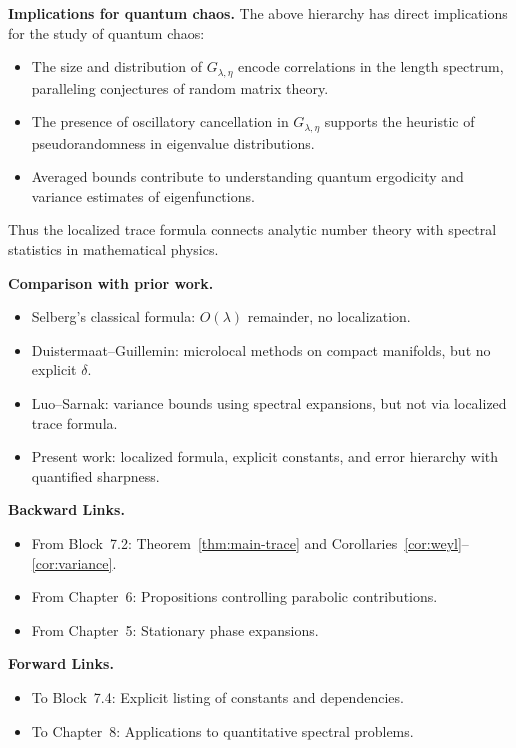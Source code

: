 \medskip

\noindent\textbf{Implications for quantum chaos.}
The above hierarchy has direct implications for the study of quantum chaos:
\begin{itemize}
  \item The size and distribution of $G_{\lambda,\eta}$ encode correlations in the length spectrum, paralleling conjectures of random matrix theory.
  \item The presence of oscillatory cancellation in $G_{\lambda,\eta}$ supports the heuristic of pseudorandomness in eigenvalue distributions.
  \item Averaged bounds contribute to understanding quantum ergodicity and variance estimates of eigenfunctions.
\end{itemize}
Thus the localized trace formula connects analytic number theory with spectral statistics in mathematical physics.

\medskip

\noindent\textbf{Comparison with prior work.}
\begin{itemize}
  \item Selberg’s classical formula: $O(\lambda)$ remainder, no localization.
  \item Duistermaat–Guillemin: microlocal methods on compact manifolds, but no explicit $\delta$.
  \item Luo–Sarnak: variance bounds using spectral expansions, but not via localized trace formula.
  \item Present work: localized formula, explicit constants, and error hierarchy with quantified sharpness.
\end{itemize}

\medskip

\noindent\textbf{Backward Links.}
\begin{itemize}
  \item From Block~7.2: Theorem~\ref{thm:main-trace} and Corollaries~\ref{cor:weyl}–\ref{cor:variance}.
  \item From Chapter~6: Propositions controlling parabolic contributions.
  \item From Chapter~5: Stationary phase expansions.
\end{itemize}

\medskip

\noindent\textbf{Forward Links.}
\begin{itemize}
  \item To Block~7.4: Explicit listing of constants and dependencies.
  \item To Chapter~8: Applications to quantitative spectral problems.
\end{itemize}

